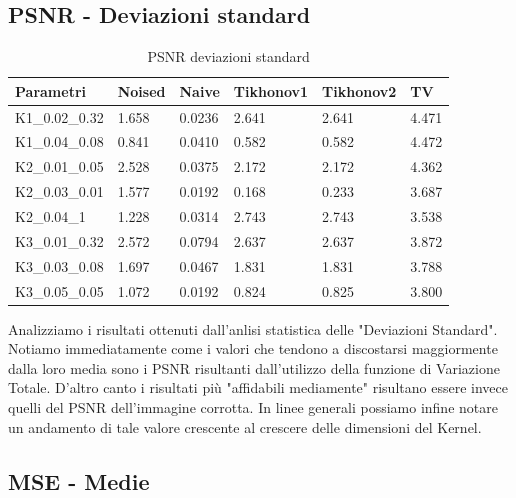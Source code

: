 \documentclass[12pt]{article}
\begin{document}
    \newpage
    \subsection{PSNR - Deviazioni standard}
    \begin{table}[!ht]
    \centering
    \begin{tabular}{|l|l|l|l|l|l|}
    \hline
        Parametri & Noised & Naive & Tikhonov1 & Tikhonov2 & TV \\ \hline
        K1\_0.02\_0.32 & 1.658 & 0.0236 & 2.641 & 2.641 & 4.471 \\ \hline
        K1\_0.04\_0.08 & 0.841 & 0.0410 & 0.582 & 0.582 & 4.472 \\ \hline
        K2\_0.01\_0.05 & 2.528 & 0.0375 & 2.172 & 2.172 & 4.362 \\ \hline
        K2\_0.03\_0.01 & 1.577 & 0.0192 & 0.168 & 0.233 & 3.687 \\ \hline
        K2\_0.04\_1    & 1.228 & 0.0314 & 2.743 & 2.743 & 3.538 \\ \hline
        K3\_0.01\_0.32 & 2.572 & 0.0794 & 2.637 & 2.637 & 3.872 \\ \hline
        K3\_0.03\_0.08 & 1.697 & 0.0467 & 1.831 & 1.831 & 3.788 \\ \hline
        K3\_0.05\_0.05 & 1.072 & 0.0192 & 0.824 & 0.825 & 3.800 \\ \hline
    \end{tabular}
    \caption{PSNR deviazioni standard}
    \label{table:8}
    \end{table}

    
    Analizziamo i risultati ottenuti dall'anlisi statistica delle "Deviazioni Standard".
    Notiamo immediatamente come i valori che tendono a discostarsi maggiormente dalla loro media sono i PSNR risultanti dall'utilizzo della funzione di Variazione Totale.
    D'altro canto i risultati più "affidabili mediamente" risultano essere invece quelli del PSNR dell'immagine corrotta.
    In linee generali possiamo infine notare un andamento di tale valore crescente al crescere delle dimensioni del Kernel.

    \newpage
    \subsection{MSE - Medie}
\end{document}

